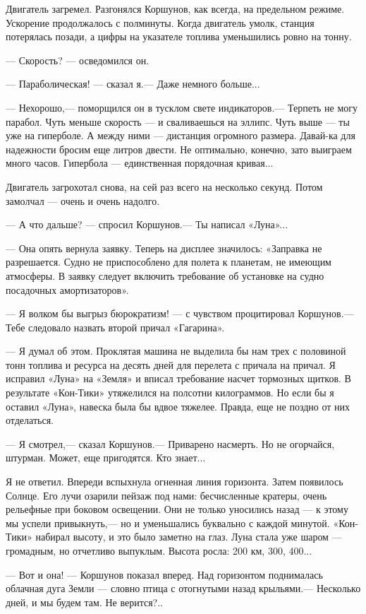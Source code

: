 \documentclass[11pt,a4paper,oneside]{article}
\begin{document}
Двигатель загремел. Разгонялся Коршунов, как всегда, на предельном режиме. Ускорение продолжалось с полминуты. Когда двигатель умолк, станция потерялась позади, а цифры на указателе топлива уменьшились ровно на тонну.

— Скорость? — осведомился он.

— Параболическая! — сказал	я.— Даже немного больше...

— Нехорошо,— поморщился он в тусклом свете индикаторов.— Терпеть не могу парабол. Чуть меньше скорость — и сваливаешься на эллипс. Чуть выше — ты уже на гиперболе. А между ними — дистанция огромного размера. Давай-ка для надежности бросим еще литров двести. Не оптимально, конечно, зато выиграем много часов. Гипербола — единственная порядочная кривая...

Двигатель загрохотал снова, на сей раз всего на несколько секунд. Потом замолчал — очень и очень надолго.

— А что дальше? — спросил Коршунов.— Ты написал «Луна»...

— Она опять вернула заявку. Теперь на дисплее значилось: «Заправка не разрешается. Судно не приспособлено для полета к планетам, не имеющим атмосферы. В заявку следует включить требование об установке на судно посадочных амортизаторов».

— Я волком бы выгрыз бюрократизм! — с чувством процитировал Коршунов.— Тебе следовало назвать второй причал «Гагарина».

— Я думал об этом. Проклятая машина не выделила бы нам трех с половиной тонн топлива и ресурса на десять дней для перелета с причала на причал. Я исправил «Луна» на «Земля» и вписал требование насчет тормозных щитков. В результате «Кон-Тики» утяжелился на полсотни килограммов. Но если бы я оставил «Луна», навеска была бы вдвое тяжелее. Правда, еще не поздно от них отделаться.

— Я смотрел,— сказал Коршунов.— Приварено насмерть. Но не огорчайся, штурман. Может, еще пригодятся. Кто знает...

Я не ответил. Впереди вспыхнула огненная линия горизонта. Затем появилось Солнце. Его лучи озарили пейзаж под нами: бесчисленные кратеры, очень рельефные при боковом освещении. Они не только уносились назад — к этому мы успели привыкнуть,— но и уменьшались буквально с каждой минутой. «Кон-Тики» набирал высоту, и это было заметно на глаз. Луна стала уже шаром — громадным, но отчетливо выпуклым. Высота росла: 200 км, 300, 400...

— Вот и она! — Коршунов показал вперед. Над горизонтом поднималась облачная дуга Земли — словно птица с отогнутыми назад крыльями.— Несколько дней, и мы будем там. Не верится?..
\end{document}
